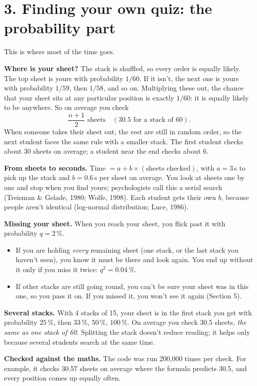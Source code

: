 \documentclass[10.5pt,a4paper]{article}
\begin{document}
\section*{3. Finding your own quiz: the probability part}
This is where most of the time goes.

\textbf{Where is your sheet?} The stack is shuffled, so every order is equally likely. The top sheet is yours with probability $1/60$. If it isn't, the next one is yours with probability $1/59$, then $1/58$, and so on. Multiplying these out, the chance that your sheet sits at any particular position is exactly $1/60$: it is equally likely to be anywhere. So on average you check
\[
\frac{n+1}{2} \text{ sheets} \quad (30.5 \text{ for a stack of } 60).
\]
When someone takes their sheet out, the rest are still in random order, so the next student faces the same rule with a smaller stack. The first student checks about 30 sheets on average; a student near the end checks about 6.

\textbf{From sheets to seconds.} Time $= a + b\times(\text{sheets checked})$, with $a = 3$\,s to pick up the stack and $b = 0.6$\,s per sheet on average. You look at sheets one by one and stop when you find yours; psychologists call this a serial search (Treisman \& Gelade, 1980; Wolfe, 1998). Each student gets their own $b$, because people aren't identical (log-normal distribution; Luce, 1986).

\textbf{Missing your sheet.} When you reach your sheet, you flick past it with probability $q = 2\,\%$.
\begin{itemize}
\item If you are holding \emph{every} remaining sheet (one stack, or the last stack you haven't seen), you know it must be there and look again. You end up without it only if you miss it twice: $q^2 = 0.04\,\%$.
\item If other stacks are still going round, you can't be sure your sheet was in this one, so you pass it on. If you missed it, you won't see it again (Section 5).
\end{itemize}

\textbf{Several stacks.} With 4 stacks of 15, your sheet is in the first stack you get with probability $25\,\%$, then $33\,\%$, $50\,\%$, $100\,\%$. On average you check 30.5 sheets, \emph{the same as one stack of 60}. Splitting the stack doesn't reduce reading; it helps only because several students search at the same time.

\textbf{Checked against the maths.} The code was run 200{,}000 times per check. For example, it checks 30.57 sheets on average where the formula predicts 30.5, and every position comes up equally often.
\end{document}
